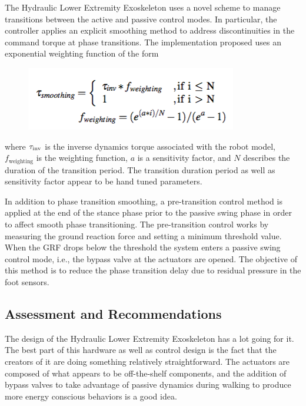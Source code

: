 The Hydraulic Lower Extremity Exoskeleton uses a novel scheme to manage transitions between the active and passive control modes.  In particular, the controller applies an explicit smoothing method to address discontinuities in the command torque at phase transitions.  The implementation proposed uses an exponential weighting function of the form
 \begin{figure}[thpb]
\centering
\includegraphics[width=3.in]{exos/figs/hydLowerExrem/weightingForm}
  \caption{}
 \end{figure}
 
 \noindent
 where ${\bf\tau}_\text{inv}$ is the inverse dynamics torque associated with the robot model, $f_\text{weighting}$ is the weighting function, $a$ is a sensitivity factor, and $N$ describes the duration of the transition period.  The transition duration period as well as sensitivity factor appear to be hand tuned parameters. 

In addition to phase transition smoothing, a pre-transition control method is applied at the end of the stance phase prior to the passive swing phase in order to affect smooth phase transitioning.  The pre-transition control works by measuring the ground reaction force and setting a minimum threshold value.  When the GRF drops below the threshold the system enters a passive swing control mode, i.e., the bypass valve at the actuators are opened.  The objective of this method is to reduce the phase transition delay due to residual pressure in the foot sensors. 


 
 \subsection{Assessment and Recommendations}
 
The design of the Hydraulic Lower Extremity Exoskeleton has a lot going for it.  The best part of this hardware as well as control design is the fact that the creators of it are doing something relatively straightforward.  The actuators are composed of what appears to be off-the-shelf components, and the addition of bypass valves to take advantage of passive dynamics during walking to produce more energy conscious behaviors is a good idea.    

